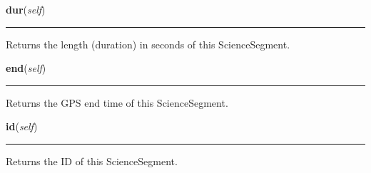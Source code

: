     \label{pipeline:ScienceSegment:dur}
    \vspace{0.5ex}

    \noindent\begin{boxedminipage}{\textwidth}

    \raggedright \textbf{dur}(\textit{self})

    \vspace{-1.5ex}

    \rule{\textwidth}{0.5\fboxrule}
    Returns the length (duration) in seconds of this ScienceSegment.

    \vspace{1ex}

    \end{boxedminipage}

    \label{pipeline:ScienceSegment:end}
    \vspace{0.5ex}

    \noindent\begin{boxedminipage}{\textwidth}

    \raggedright \textbf{end}(\textit{self})

    \vspace{-1.5ex}

    \rule{\textwidth}{0.5\fboxrule}
    Returns the GPS end time of this ScienceSegment.

    \vspace{1ex}

    \end{boxedminipage}

    \label{pipeline:ScienceSegment:id}
    \vspace{0.5ex}

    \noindent\begin{boxedminipage}{\textwidth}

    \raggedright \textbf{id}(\textit{self})

    \vspace{-1.5ex}

    \rule{\textwidth}{0.5\fboxrule}
    Returns the ID of this ScienceSegment.

    \vspace{1ex}

    \end{boxedminipage}

